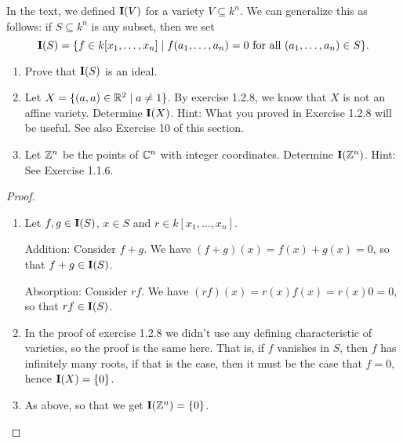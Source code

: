 \begin{exercise}{15}
In the text, we defined $\mathbf{I}(V)$ for a variety $V\subseteq k^n$. We can generalize this as follows: if $S\subseteq k^n$ is any subset, then we set
\[
\mathbf{I}(S)=\{f\in k[x_1,\dots,x_n]\mid f(a_1,\dots,a_n)=0\text{ for all }(a_1,\dots,a_n)\in S\}.
\]
\begin{enumerate}
    \item Prove that $\mathbf{I}(S)$ is an ideal.
    \item Let $X=\{(a,a)\in\mathbb{R}^2\mid a\neq 1\}$. By exercise 1.2.8, we know that $X$ is not an affine variety. Determine $\mathbf{I}(X)$. Hint: What you proved in Exercise 1.2.8 will be useful. See also Exercise 10 of this section.
    \item Let $\mathbb{Z}^n$ be the points of $\mathbb{C}^n$ with integer coordinates. Determine $\mathbf{I}(\mathbb{Z}^n)$. Hint: See Exercise 1.1.6.
\end{enumerate}
\end{exercise}
\begin{proof}
\begin{enumerate}
    \item Let $f,g\in\mathbf{I}(S)$, $x\in S$ and $r\in k[x_1,\dots,x_n]$. 

    Addition: Consider $f+g$. We have $(f+g)(x) =f(x)+g(x) =0$, so that $f+g\in\mathbf{I}(S)$.

    Absorption: Consider $rf$. We have $(rf)(x) =r(x)f(x) =r(x)0 =0$, so that $rf\in\mathbf{I}(S)$.
    \item In the proof of exercise 1.2.8 we didn't use any defining characteristic of varieties, so the proof is the same here. That is, if $f$ vanishes in $S$, then $f$ has infinitely many roots, if that is the case, then it must be the case that $f=0$, hence $\mathbf{I}(X)=\{0\}$.
    \item As above, so that we get $\mathbf{I}(\mathbb{Z}^n)=\{0\}$.
\end{enumerate}
\end{proof}
